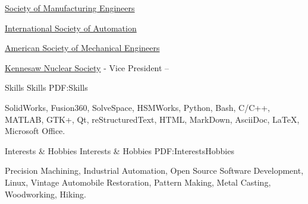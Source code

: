 \documentclass[
letterpaper,
MMMyyyy,
nonstopmode,
draftmode,
]{resume}
\begin{document}
\begin{Body}
\BulletItem
\href{http://www.sme.org/}
{Society of Manufacturing Engineers}

\BulletItem
\href{http://www.isa.org/}
{International Society of Automation}

\BulletItem
\href{http://www.asme.org/}
{American Society of Mechanical Engineers}

\BulletItem
\href{https://owllife.kennesaw.edu/organization/KNS}
{Kennesaw Nuclear Society} -
Vice President
\hfill
{} -- 



\Section
{Skills}
{Skills}
{PDF:Skills}

\Entry
SolidWorks, Fusion360, SolveSpace, HSMWorks,
Python, Bash, C/C++, MATLAB, GTK+, Qt,
reStructuredText, HTML, MarkDown, AsciiDoc, \LaTeX,
Microsoft Office.



\Section
{Interests \& Hobbies}
{Interests \& Hobbies}
{PDF:InterestsHobbies}

\Entry
Precision Machining,
Industrial Automation,
Open Source Software Development,
Linux,
Vintage Automobile Restoration,
Pattern Making, Metal Casting,
Woodworking, Hiking.

\end{Body}
\end{document}
